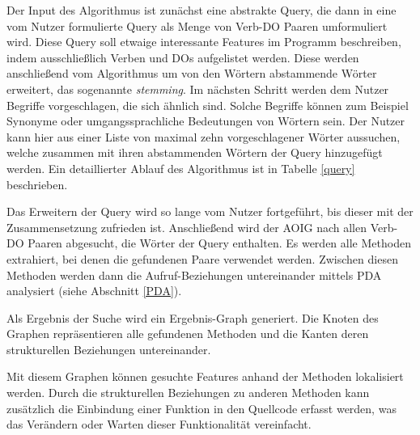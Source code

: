\documentclass[runningheads,a4paper]{llncs}
\begin{document}
Der Input des Algorithmus ist zunächst eine abstrakte Query, die dann in eine vom Nutzer formulierte Query als Menge von Verb-DO Paaren umformuliert wird. Diese Query soll etwaige interessante Features im Programm beschreiben, indem ausschließlich Verben und DOs aufgelistet werden. Diese werden anschließend vom Algorithmus um von den Wörtern abstammende Wörter erweitert, das sogenannte \textit{stemming}. Im nächsten Schritt werden dem Nutzer Begriffe vorgeschlagen, die sich ähnlich sind. Solche Begriffe können zum Beispiel Synonyme oder umgangssprachliche Bedeutungen von Wörtern sein. Der Nutzer kann hier aus einer Liste von maximal zehn vorgeschlagener Wörter aussuchen, welche zusammen mit ihren abstammenden Wörtern der Query hinzugefügt werden. Ein detaillierter Ablauf des Algorithmus ist in Tabelle \ref{query} beschrieben.

Das Erweitern der Query wird so lange vom Nutzer fortgeführt, bis dieser mit der Zusammensetzung zufrieden ist. Anschließend wird der AOIG nach allen Verb-DO Paaren abgesucht, die Wörter der Query enthalten. Es werden alle Methoden extrahiert, bei denen die gefundenen Paare verwendet werden. Zwischen diesen Methoden werden dann die Aufruf-Beziehungen untereinander mittels PDA analysiert (siehe Abschnitt \ref{PDA}).

Als Ergebnis der Suche wird ein Ergebnis-Graph generiert. Die Knoten des Graphen repräsentieren alle gefundenen Methoden und die Kanten deren strukturellen Beziehungen untereinander.

Mit diesem Graphen können gesuchte Features anhand der Methoden lokalisiert werden. Durch die strukturellen Beziehungen zu anderen Methoden kann zusätzlich die Einbindung einer Funktion in den Quellcode erfasst werden, was das Verändern oder Warten dieser Funktionalität vereinfacht.
\end{document}
